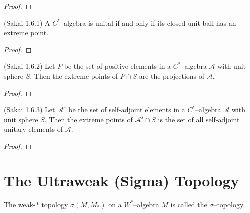 \begin{proof}
  \leanok
\end{proof}


\begin{theorem}
  \label{thm:cstar_unital_iff_extreme_Sak_1_6_1} (Sakai 1.6.1)
  \leanok
  A $C^{*}$--algebra is unital if and only if its closed unit ball has an extreme point.
\end{theorem}

\begin{proof}
  \leanok
\end{proof}

\begin{proposition}
  \label{prop:extr_pos_projs_Sak_1_6_2} (Sakai 1.6.2)
  \leanok
  Let $P$ be the set of positive elements in a $C^{*}$--algebra $\mathcal{A}$ with unit sphere $S$. Then the extreme
  points of $P\cap S$ are the projections of $\mathcal{A}$.
\end{proposition}

\begin{proof}
  \leanok
\end{proof}

\begin{proposition}
  \label{prop:extr_sa_sa_unitaries_Sak_1_6_3} (Sakai 1.6.3)
  \leanok
  Let $\mathcal{A}^{s}$ be the set of self-adjoint elements in a $C^{*}$--algebra $\mathcal{A}$ with unit sphere $S$. Then
  the extreme points of $\mathcal{A}^{s}\cap S$ is the set of all self-adjoint unitary elements of $\mathcal{A}$.
\end{proposition}

\begin{proof}
  \leanok
\end{proof}

\section{The Ultraweak (Sigma) Topology}

\begin{definition}
  \label{def:sigma_top}
  \leanok
  The weak-$*$ topology $\sigma(M,M_{*})$ on a $W^{*}$--algebra $M$ is called the $\sigma$--topology.
\end{definition}

